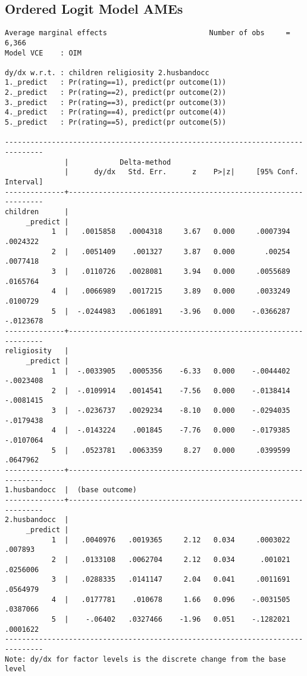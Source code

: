 \documentclass{article}
\begin{document}
\newpage
\hypertarget{ologitame}{\subsection*{Ordered Logit Model AMEs}}
\begin{verbatim}
Average marginal effects                        Number of obs     =      6,366
Model VCE    : OIM

dy/dx w.r.t. : children religiosity 2.husbandocc
1._predict   : Pr(rating==1), predict(pr outcome(1))
2._predict   : Pr(rating==2), predict(pr outcome(2))
3._predict   : Pr(rating==3), predict(pr outcome(3))
4._predict   : Pr(rating==4), predict(pr outcome(4))
5._predict   : Pr(rating==5), predict(pr outcome(5))

-------------------------------------------------------------------------------
              |            Delta-method
              |      dy/dx   Std. Err.      z    P>|z|     [95% Conf. Interval]
--------------+----------------------------------------------------------------
children      |
     _predict |
           1  |   .0015858   .0004318     3.67   0.000     .0007394    .0024322
           2  |   .0051409    .001327     3.87   0.000       .00254    .0077418
           3  |   .0110726   .0028081     3.94   0.000     .0055689    .0165764
           4  |   .0066989   .0017215     3.89   0.000     .0033249    .0100729
           5  |  -.0244983   .0061891    -3.96   0.000    -.0366287   -.0123678
--------------+----------------------------------------------------------------
religiosity   |
     _predict |
           1  |  -.0033905   .0005356    -6.33   0.000    -.0044402   -.0023408
           2  |  -.0109914   .0014541    -7.56   0.000    -.0138414   -.0081415
           3  |  -.0236737   .0029234    -8.10   0.000    -.0294035   -.0179438
           4  |  -.0143224    .001845    -7.76   0.000    -.0179385   -.0107064
           5  |   .0523781   .0063359     8.27   0.000     .0399599    .0647962
--------------+----------------------------------------------------------------
1.husbandocc  |  (base outcome)
--------------+----------------------------------------------------------------
2.husbandocc  |
     _predict |
           1  |   .0040976   .0019365     2.12   0.034     .0003022     .007893
           2  |   .0133108   .0062704     2.12   0.034      .001021    .0256006
           3  |   .0288335   .0141147     2.04   0.041     .0011691    .0564979
           4  |   .0177781    .010678     1.66   0.096    -.0031505    .0387066
           5  |    -.06402   .0327466    -1.96   0.051    -.1282021    .0001622
-------------------------------------------------------------------------------
Note: dy/dx for factor levels is the discrete change from the base level
\end{verbatim}
\end{document}

